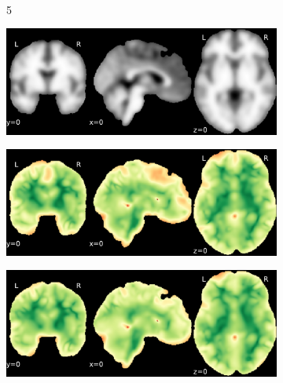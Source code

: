 \documentclass{article}
\begin{document}
\begin{appendices}
\begin{landscape}
\begin{figure}
\begin{subfigure}[t]{0.2\paperheight}
            \end{subfigure} \\
            \begin{subfigure}[b][][c]{0.01\paperwidth} 5 \vspace*{15pt} \end{subfigure}
            \begin{subfigure}[t]{0.2\paperheight}
                \centering
                \includegraphics[width=\textwidth]{figures/sig/10mm/ieee_ds001748_sub-adult15.pdf}
            \end{subfigure}
            \begin{subfigure}[t]{0.2\paperheight}
                \centering
                \includegraphics[width=\textwidth]{figures/sig/10mm/rr_ds001748_sub-adult15_sig.pdf}
            \end{subfigure}
            \begin{subfigure}[t]{0.2\paperheight}
                \centering
                \includegraphics[width=\textwidth]{figures/sig/10mm/rs_ds001748_sub-adult15_sig.pdf}

\end{subfigure}
\end{figure}
\end{landscape}
\end{appendices}
\end{document}
